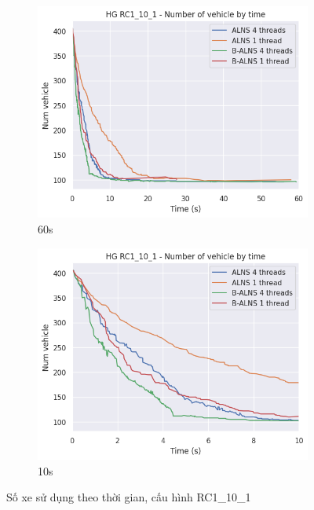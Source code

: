 \begin{figure}[H] %
  \label{fig:perf_ct_rc1}
  \begin{subfigure}{.5\textwidth}
    \centering
    \includegraphics[width=0.9\linewidth]{figures/nv_time_60s_RC1_10_1.png}
    \caption{60s}
    \label{fig:perf_ct_rc1_60s}
  \end{subfigure}%
  \begin{subfigure}{.5\textwidth}
    \centering
    \includegraphics[width=0.9\linewidth]{figures/nv_time_10s_RC1_10_1.png}
    \caption{10s}
    \label{fig:perf_ct_rc1_10s}
  \end{subfigure}
  \caption{Số xe sử dụng theo thời gian, cấu hình RC1\_10\_1}
\end{figure}

